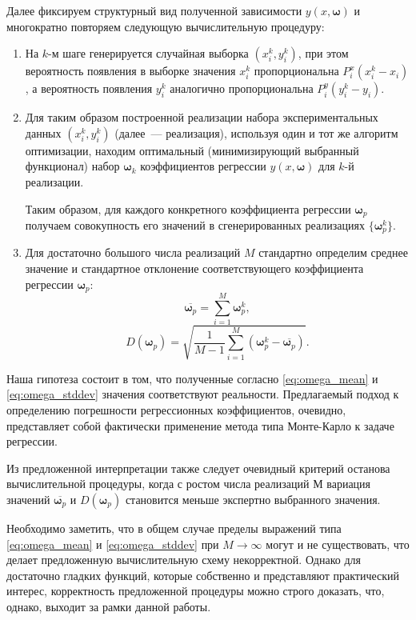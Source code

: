 \documentclass[11pt,a4paper]{article}
\theoremstyle{definition}
\begin{document}
Далее фиксируем структурный вид полученной зависимости $y(x, \boldsymbol{\omega})$ и
многократно повторяем следующую вычислительную процедуру:
\begin{enumerate}
  \item На $k$-м шаге генерируется случайная выборка $(x_i^k, y_i^k)$, при этом
	вероятность появления в выборке значения $x_i^k$ пропорциональна
	$P_i^x (x_i^k - x_i)$, а вероятность появления $y_i^k$ аналогично
	пропорциональна $P_i^y (y_i^k - y_i)$.
  \item Для таким образом построенной реализации набора экспериментальных
    данных $(x_i^k, y_i^k)$ (далее~--- реализация), используя один и тот же
    алгоритм оптимизации, находим оптимальный (минимизирующий выбранный
	функционал) набор $\boldsymbol{\omega}_k$ коэффициентов регрессии
	$y(x, \boldsymbol{\omega})$ для $k$-й реализации.

	Таким образом, для каждого конкретного коэффициента регрессии
	$\boldsymbol{\omega}_p$ получаем совокупность его значений в сгенерированных реализациях
	$\{ \boldsymbol{\omega}_p^k \}$.
  \item Для достаточно большого числа реализаций $M$ стандартно определим
	  среднее значение и стандартное отклонение соответствующего
	  коэффициента регрессии $\boldsymbol{\omega}_p$:
	  \begin{equation}
		\label{eq:omega_mean}
		\overline{\boldsymbol{\omega}_p} = \sum_{i = 1}^M \boldsymbol{\omega}_p^k,
	  \end{equation}
	  \begin{equation}
		\label{eq:omega_stddev}
		D(\boldsymbol{\omega}_p) = \sqrt{\frac{1}{M - 1} \sum_{i = 1}^M (\boldsymbol{\omega}_p^k - \overline{\boldsymbol{\omega}_p})}.
	  \end{equation}
\end{enumerate}

Наша гипотеза состоит в том, что полученные согласно \eqref{eq:omega_mean} и \eqref{eq:omega_stddev}
значения соответствуют реальности. Предлагаемый подход к определению
погрешности регрессионных коэффициентов, очевидно, представляет собой
фактически применение метода типа Монте-Карло к задаче регрессии.

Из предложенной интерпретации также следует очевидный критерий
останова вычислительной процедуры, когда с ростом числа реализаций $М$
вариация значений $\overline{\boldsymbol{\omega}_p}$ и
$D(\boldsymbol{\omega}_p)$ становится меньше экспертно выбранного
значения.

Необходимо заметить, что в общем случае пределы выражений типа
\eqref{eq:omega_mean} и \eqref{eq:omega_stddev}
при $M \rightarrow \infty$ могут и не существовать, что делает предложенную
вычислительную схему некорректной. Однако для достаточно гладких
функций, которые собственно и представляют практический интерес,
корректность предложенной процедуры можно строго доказать, что, однако,
выходит за рамки данной работы.
\end{document}
